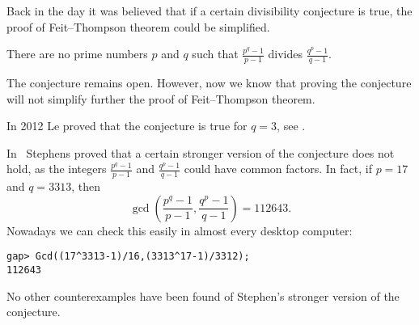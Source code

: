 Back in the day it was believed that if a certain divisibility 
conjecture is true, 
the proof of Feit--Thompson theorem 
could be simplified. 

\begin{conjecture}
    There are no prime numbers $p$ and $q$ such that
    $\frac {p^{q}-1}{p-1}$ divides $\frac{q^{p} - 1}{q - 1}$. 
\end{conjecture}

The conjecture remains open. However, now we know that 
proving the conjecture will not simplify further
the proof of Feit--Thompson theorem. 

In 2012 Le proved that the conjecture is true for $q=3$, see 
\cite{MR2900154}. 


In~\cite{MR297686} 
Stephens proved that a certain stronger version of the conjecture 
does not hold, as the integers 
$\frac {p^{q}-1}{p-1}$ and $\frac{q^{p} - 1}{q - 1}$ 
could have common factors. In fact, if $p=17$ and $q=3313$, 
then 
\[
\gcd\left(\frac {p^{q}-1}{p-1},\frac{q^{p} - 1}{q - 1}\right)=112643.
\]
Nowadays we can check this easily in almost every desktop computer:
\begin{lstlisting}
gap> Gcd((17^3313-1)/16,(3313^17-1)/3312);
112643
\end{lstlisting}
No other counterexamples have been found of Stephen’s stronger version of the conjecture.



